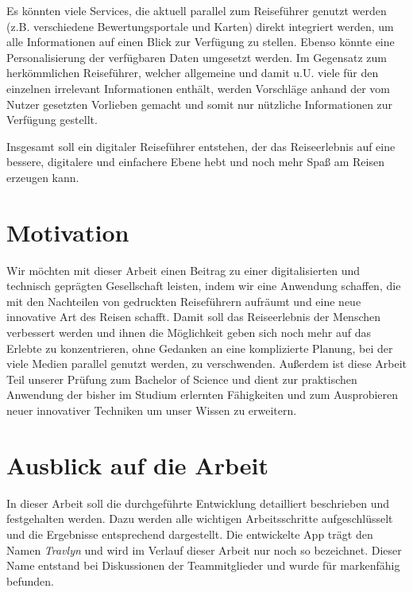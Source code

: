 	Es könnten viele Services, die aktuell parallel zum Reiseführer genutzt werden (z.B. verschiedene Bewertungsportale und Karten) direkt integriert werden, um alle Informationen auf einen Blick zur Verfügung zu stellen. Ebenso könnte eine Personalisierung der verfügbaren Daten umgesetzt werden. Im Gegensatz zum herkömmlichen Reiseführer, welcher allgemeine und damit u.U. viele für den einzelnen irrelevant Informationen enthält, werden Vorschläge anhand der vom Nutzer gesetzten Vorlieben gemacht und somit nur nützliche Informationen zur Verfügung gestellt.

	\vspace{0.25cm}

	Insgesamt soll ein digitaler Reiseführer entstehen, der das Reiseerlebnis auf eine bessere, digitalere und einfachere Ebene hebt und noch mehr Spaß am Reisen erzeugen kann.

	\section{Motivation}

	Wir möchten mit dieser Arbeit einen Beitrag zu einer digitalisierten und technisch geprägten Gesellschaft leisten, indem wir eine Anwendung schaffen, die mit den Nachteilen von gedruckten Reiseführern aufräumt und eine neue innovative Art des Reisen schafft. Damit soll das Reiseerlebnis der Menschen verbessert werden und ihnen die Möglichkeit geben sich noch mehr auf das Erlebte zu konzentrieren, ohne Gedanken an eine komplizierte Planung, bei der viele Medien parallel genutzt werden, zu verschwenden.
	Außerdem ist diese Arbeit Teil unserer Prüfung zum Bachelor of Science und dient zur praktischen Anwendung der bisher im Studium erlernten Fähigkeiten und zum Ausprobieren neuer innovativer Techniken um unser Wissen zu erweitern.   

	\section{Ausblick auf die Arbeit}
	
	In dieser Arbeit soll die durchgeführte Entwicklung detailliert beschrieben und festgehalten werden. Dazu werden alle wichtigen Arbeitsschritte aufgeschlüsselt und die Ergebnisse entsprechend dargestellt. Die entwickelte App trägt den Namen \textit{Travlyn} und wird im Verlauf dieser Arbeit nur noch so bezeichnet. Dieser Name entstand bei Diskussionen der Teammitglieder und wurde für markenfähig befunden. 
	
